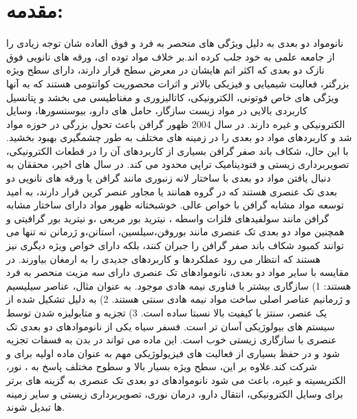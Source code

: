 \section{مقدمه:}
نانومواد دو بعدی به دلیل ویژگی های منحصر به فرد و فوق العاده شان توجه زیادی را از جامعه علمی به خود جلب کرده اند.\cite{huangGraphenebasedComposites2012, huangGrapheneBasedMaterialsSynthesis2011}بر خلاف مواد توده ای، ورقه های نانویی فوق نازک دو بعدی که اکثر اتم هایشان در معرض سطح قرار دارند، دارای سطح ویژه بزرگتر، فعالیت شیمیایی و فیزیکی بالاتر و اثرات محصوریت کوانتومی هستند که به آنها ویژگی های خاص فوتونی، الکترونیکی، کاتالیزوری و مغناطیسی می بخشد و پتانسیل کاربردی بالایی در مواد زیست سازگار، حامل های دارو، بیوسنسورها، وسایل الکترونیکی و غیره دارند.\cite{lu2DTransitionMetalDichalcogenideNanosheetBasedComposites2016, chhowallaChemistryTwodimensionalLayered2013, sunElectronicStructuresSiC2008} در سال 2004 ظهور گرافن باعث تحول بزرگی در حوزه مواد شد و کاربردهای مواد دو بعدی را در زمینه های مختلف به طور چشمگیری بهبود بخشید. \cite{novoselovElectricFieldEffect2004, geimRiseGraphene2007} با این حال، شکاف باند صفر گرافن بسیاری از کاربردهای آن را در قطعات الکترونیکی، تصویربرداری زیستی و فتودینامیک تراپی محدود می کند. در سال های اخیر، محققان به دنبال یافتن مواد دو بعدی با ساختار لانه زنبوری مانند گرافن یا ورقه های نانویی دو بعدی تک عنصری هستند که در گروه همانند یا مجاور عنصر کربن قرار دارند، به امید توسعه مواد مشابه گرافن با خواص عالی. خوشبختانه ظهور مواد دارای ساختار مشابه گرافن مانند سولفیدهای فلزات واسطه \cite{dingDefectEngineeredBioactive2019, liRatiometricImmunoassaysBuilt2019}، نیترید بور مربعی \cite{deanBoronNitrideSubstrates2010}،و نیترید بور گرافیتی \cite{caoPolymericPhotocatalystsBased2015}و همچنین مواد دو بعدی تک عنصری مانند بوروفن\cite{fengExperimentalRealizationTwodimensional2016}،سیلسین\cite{fengEvidenceSiliceneHoneycomb2012,chenEvidenceDiracFermions2012,duTuningBandGap2014}، استانن\cite{gouStraininducedBandEngineering2017, zhuEpitaxialGrowthTwodimensional2015}،و ژرمانن \cite{niTunableBandgapSilicene2012} نه تنها می توانند کمبود شکاف باند صفر گرافن را جبران کنند، بلکه دارای خواص ویژه دیگری نیز هستند که انتظار می رود عملکردها و کاربردهای جدیدی را به ارمغان بیاورند. در مقایسه با سایر مواد دو بعدی، نانوموادهای تک عنصری دارای سه مزیت منحصر به فرد هستند: 1) سازگاری بیشتر با فناوری نیمه هادی موجود. به عنوان مثال، عناصر سیلیسیم و ژرمانیم عناصر اصلی ساخت مواد نیمه هادی سنتی هستند. 2) به دلیل تشکیل شده از یک عنصر، سنتز با کیفیت بالا نسبتا ساده است. 3) تجزیه و متابولیزه شدن توسط سیستم های بیولوژیکی آسان تر است. فسفر سیاه یکی از نانوموادهای دو بعدی تک عنصری با سازگاری زیستی خوب است. این ماده می تواند در بدن به فسفات تجزیه شود و در حفظ بسیاری از فعالیت های فیزیولوژیکی مهم به عنوان ماده اولیه برای  و  شرکت کند.\cite{shaoBiodegradableBlackPhosphorusbased2016,taoBlackPhosphorusNanosheets2017}علاوه بر این، سطح ویژه بسیار بالا و سطوح مختلف پاسخ به ، نور، الکتریسیته و غیره، باعث می شود نانوموادهای دو بعدی تک عنصری به گزینه های برتر برای وسایل الکترونیکی، انتقال دارو، درمان نوری، تصویربرداری زیستی و سایر زمینه ها تبدیل شوند. \cite{liEngineeredFunctionalized2D2020,shiPHSensitiveNanoscaleMaterials2020}

